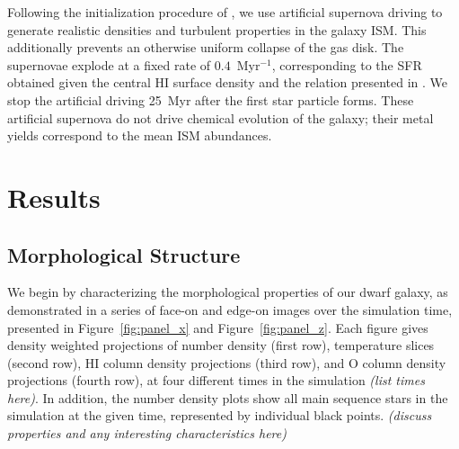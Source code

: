 \documentclass[twocolumn]{aastex61}
\begin{document}
Following the initialization procedure of \cite{Hu2017}, we use artificial supernova driving to generate realistic densities and turbulent properties in the galaxy ISM. This additionally prevents an otherwise uniform collapse of the gas disk. The supernovae explode at a fixed rate of $0.4$~Myr$^{-1}$, corresponding to the SFR obtained given the central HI surface density and the relation presented in \citep{Roychowdhury2009}. We stop the artificial driving 25~Myr after the first star particle forms. These artificial supernova do not drive chemical evolution of the galaxy; their metal yields correspond to the mean ISM abundances. 

\section{Results}
\label{sec:results}





\subsection{Morphological Structure}
\label{sec:structure}

We begin by characterizing the morphological properties of our dwarf galaxy, as demonstrated in a series of face-on and edge-on images over the simulation time, presented in Figure~\ref{fig:panel_x} and Figure~\ref{fig:panel_z}. Each figure gives density weighted projections of number density (first row), temperature slices (second row), HI column density projections (third row), and O column density projections (fourth row), at four different times in the simulation \textit{(list times here)}. In addition, the number density plots show all main sequence stars in the simulation at the given time, represented by individual black points. \textit{(discuss properties and any interesting characteristics here)}
\end{document}
